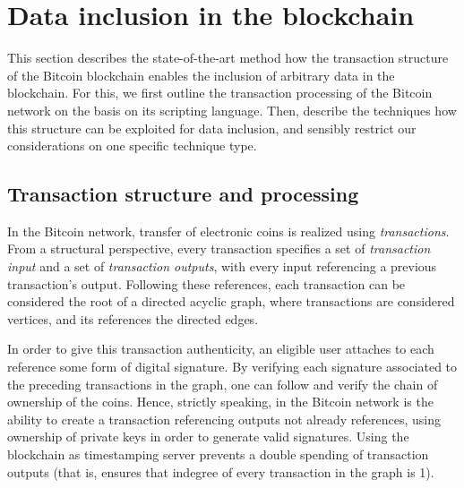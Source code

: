 \documentclass[a4paper,11pt,titlepage]{scrbook}
\begin{document}

\chapter{Data inclusion in the blockchain}

This section describes the state-of-the-art method how the transaction structure of the Bitcoin blockchain enables the inclusion of arbitrary data in the blockchain.
For this, we first outline the transaction processing of the Bitcoin network on the basis on its scripting language. Then, describe the techniques how this structure can be exploited for data inclusion, and sensibly restrict our considerations on one specific technique type.


\section{Transaction structure and processing}


In the Bitcoin network, transfer of electronic coins is realized using \emph{transactions}.
From a structural perspective, every transaction specifies a set of \emph{transaction input} and a set of \emph{transaction outputs}, with every input referencing a previous transaction's output.
Following these references, each transaction can be considered the root of a directed acyclic graph, where transactions are considered vertices, and its references the directed edges.

In order to give this transaction authenticity, an eligible user attaches to each reference some form of digital signature.
By verifying each signature associated to the preceding transactions in the graph, one can follow and verify the chain of ownership of the coins.
Hence, strictly speaking,  in the Bitcoin network is the ability to create a transaction referencing outputs not already references, using ownership of private keys in order to generate valid signatures.
Using the blockchain as timestamping server prevents a double spending of transaction outputs (that is, ensures that indegree of every transaction in the graph is 1).
\end{document}

